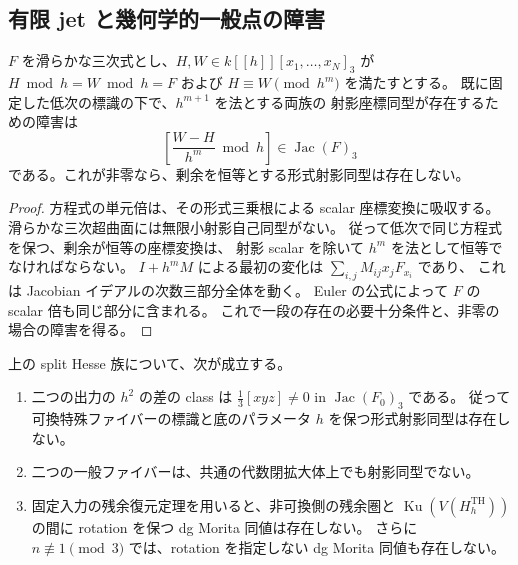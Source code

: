 \subsection{有限 jet と幾何学的一般点の障害}

\begin{lemma}
\label{lem:nfm-first-difference-jet}
$F$ を滑らかな三次式とし、$H,W\in k[[h]][x_1,\ldots,x_N]_3$ が
$H\bmod h=W\bmod h=F$ および $H\equiv W\pmod{h^m}$ を満たすとする。
既に固定した低次の標識の下で、$h^{m+1}$ を法とする両族の
射影座標同型が存在するための障害は
\[
 \left[\frac{W-H}{h^m}\bmod h\right]\in\operatorname{Jac}(F)_3
\]
である。これが非零なら、剰余を恒等とする形式射影同型は存在しない。
\end{lemma}

\begin{proof}
方程式の単元倍は、その形式三乗根による scalar 座標変換に吸収する。
滑らかな三次超曲面には無限小射影自己同型がない。
従って低次で同じ方程式を保つ、剰余が恒等の座標変換は、
射影 scalar を除いて $h^m$ を法として恒等でなければならない。
$I+h^mM$ による最初の変化は $\sum_{i,j}M_{ij}x_jF_{x_i}$ であり、
これは Jacobian イデアルの次数三部分全体を動く。
Euler の公式によって $F$ の scalar 倍も同じ部分に含まれる。
これで一段の存在の必要十分条件と、非零の場合の障害を得る。
\end{proof}

\begin{theorem}
\label{thm:nfm-th-residual-obstruction}
上の split Hesse 族について、次が成立する。
\begin{enumerate}
\item 二つの出力の $h^2$ の差の class は
$\tfrac13[xyz]\ne0$ in $\operatorname{Jac}(F_0)_3$ である。
従って可換特殊ファイバーの標識と底のパラメータ $h$ を保つ形式射影同型は存在しない。
\item 二つの一般ファイバーは、共通の代数閉拡大体上でも射影同型でない。
\item 固定入力の残余復元定理を用いると、非可換側の残余圏と
$\operatorname{Ku}(V(H_h^{\mathrm{TH}}))$ の間に rotation を保つ dg Morita 同値は存在しない。
さらに $n\not\equiv1\pmod3$ では、rotation を指定しない dg Morita 同値も存在しない。
\end{enumerate}
\end{theorem}

